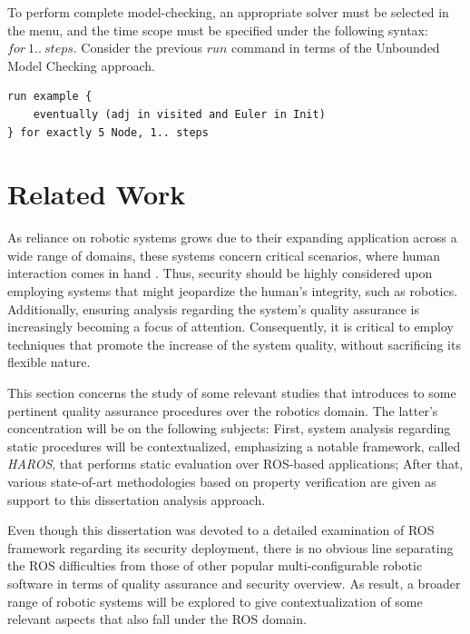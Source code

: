 To perform complete model-checking, an appropriate solver must be selected in the  menu, and the time scope must be specified under the following syntax: $for\ 1..\ steps$. Consider the previous $run$ command in terms of the Unbounded Model Checking approach. 

\begin{lstlisting}[title={Unbounded Model Checking: Eventually the graph will represent an \textit{Eulerian} circuit.}, otherkeywords = {run, eventually, in, and, for, exactly, \5, steps}, floatplacement=H]
run example {
    eventually (adj in visited and Euler in Init)
} for exactly 5 Node, 1.. steps
\end{lstlisting}

\section{Related Work}\label{s:relWork-pv}

As reliance on robotic systems grows due to their expanding application across a wide range of domains, these systems concern critical scenarios, where human interaction comes in hand \cite{diluoffo2018robot}. Thus, security should be highly considered upon employing systems that might jeopardize the human's integrity, such as robotics. Additionally, ensuring analysis regarding the system's quality assurance is increasingly becoming a focus of attention. Consequently, it is critical to employ techniques that promote the increase of the system quality, without sacrificing its flexible nature.

This section concerns the study of some relevant studies that introduces to some pertinent quality assurance procedures over the robotics domain. The latter's concentration will be on the following subjects: First, system analysis regarding static procedures will be contextualized, emphasizing a notable framework, called \textit{HAROS}, that performs static evaluation over ROS-based applications; After that, various state-of-art methodologies based on property verification are given as support to this dissertation analysis approach.

Even though this dissertation was devoted to a detailed examination of ROS framework regarding its security deployment, there is no obvious line separating the ROS difficulties from those of other popular multi-configurable robotic software in terms of quality assurance and security overview. As result, a broader range of robotic systems will be explored to give contextualization of some relevant aspects that also fall under the ROS domain.

